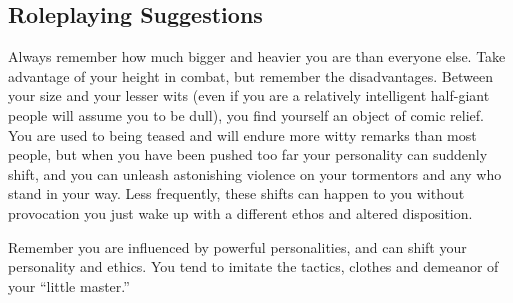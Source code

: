 \subsection{Roleplaying Suggestions}
Always remember how much bigger and heavier you are than everyone else. Take advantage of your height in combat, but remember the disadvantages. Between your size and your lesser wits (even if you are a relatively intelligent half-giant people will assume you to be dull), you find yourself an object of comic relief. You are used to being teased and will endure more witty remarks than most people, but when you have been pushed too far your personality can suddenly shift, and you can unleash astonishing violence on your tormentors and any who stand in your way. Less frequently, these shifts can happen to you without provocation you just wake up with a different ethos and altered disposition.

Remember you are influenced by powerful personalities, and can shift your personality and ethics. You tend to imitate the tactics, clothes and demeanor of your ``little master.''
